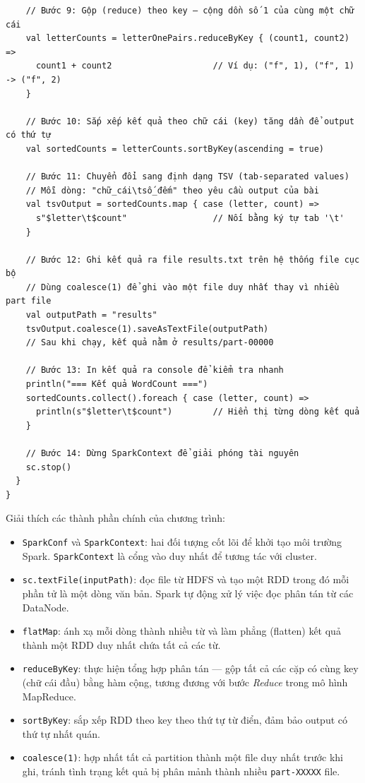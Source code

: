 \documentclass[12pt,a4paper]{article}
\begin{document}
\begin{verbatim}
    // Bước 9: Gộp (reduce) theo key — cộng dồn số 1 của cùng một chữ cái
    val letterCounts = letterOnePairs.reduceByKey { (count1, count2) =>
      count1 + count2                    // Ví dụ: ("f", 1), ("f", 1) -> ("f", 2)
    }

    // Bước 10: Sắp xếp kết quả theo chữ cái (key) tăng dần để output có thứ tự
    val sortedCounts = letterCounts.sortByKey(ascending = true)

    // Bước 11: Chuyển đổi sang định dạng TSV (tab-separated values)
    // Mỗi dòng: "chữ_cái\tsố_đếm" theo yêu cầu output của bài
    val tsvOutput = sortedCounts.map { case (letter, count) =>
      s"$letter\t$count"                 // Nối bằng ký tự tab '\t'
    }

    // Bước 12: Ghi kết quả ra file results.txt trên hệ thống file cục bộ
    // Dùng coalesce(1) để ghi vào một file duy nhất thay vì nhiều part file
    val outputPath = "results"
    tsvOutput.coalesce(1).saveAsTextFile(outputPath)
    // Sau khi chạy, kết quả nằm ở results/part-00000

    // Bước 13: In kết quả ra console để kiểm tra nhanh
    println("=== Kết quả WordCount ===")
    sortedCounts.collect().foreach { case (letter, count) =>
      println(s"$letter\t$count")        // Hiển thị từng dòng kết quả
    }

    // Bước 14: Dừng SparkContext để giải phóng tài nguyên
    sc.stop()
  }
}
\end{verbatim}

Giải thích các thành phần chính của chương trình:

\begin{itemize}
  \item \texttt{SparkConf} và \texttt{SparkContext}: hai đối
        tượng cốt lõi để khởi tạo môi trường Spark. \texttt{SparkContext}
        là cổng vào duy nhất để tương tác với cluster.

  \item \texttt{sc.textFile(inputPath)}: đọc file từ HDFS và tạo một RDD
        trong đó mỗi phần tử là một dòng văn bản. Spark tự động xử lý việc đọc phân
        tán từ các DataNode.

  \item \texttt{flatMap}: ánh xạ mỗi dòng thành nhiều từ và làm phẳng
        (flatten) kết quả thành một RDD duy nhất chứa tất cả các từ.

  \item \texttt{reduceByKey}: thực hiện tổng hợp phân tán — gộp tất cả
        các cặp có cùng key (chữ cái đầu) bằng hàm cộng, tương đương với bước
        \textit{Reduce} trong mô hình MapReduce.

  \item \texttt{sortByKey}: sắp xếp RDD theo key theo thứ tự từ điển,
        đảm bảo output có thứ tự nhất quán.

  \item \texttt{coalesce(1)}: hợp nhất tất cả partition thành một file
        duy nhất trước khi ghi, tránh tình trạng kết quả bị phân mảnh thành nhiều
        \texttt{part-XXXXX} file.
\end{itemize}
\end{document}
